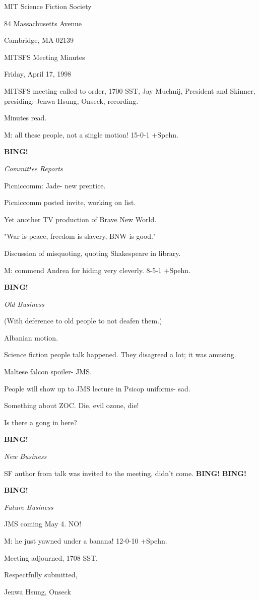 \documentclass[12pt]{article}
\newcommand{\bing}{{\bf BING!} }
\newcommand{\goto}[1]{\bing \vskip 12pt \centerline{{\em{#1}}}}
\begin{document}
\begin{center}

MIT Science Fiction Society 

84 Massachusetts Avenue

Cambridge, MA 02139

\vspace{12pt}

MITSFS Meeting Minutes 

Friday, April 17, 1998

\end{center}
 
\vspace{18pt}

\setlength{\parskip}{6pt}

\noindent
MITSFS meeting called to order, 1700 SST,
Jay Muchnij, President and Skinner, presiding; Jenwa Hsung, Onseck, recording.

Minutes read.

M: all these people, not a single motion! 15-0-1 +Spehn.

\goto{Committee Reports}

Picniccomm: Jade- new prentice.

Picniccomm posted invite, working on list.

Yet another TV production of Brave New World.

"War is peace, freedom is slavery, BNW is good."

Discussion of misquoting, quoting Shakespeare in library.

M: commend Andrea for hiding very cleverly. 8-5-1 +Spehn.

\goto{Old Business}

(With deference to old people to not deafen them.)

Albanian motion.

Science fiction people talk happened. They disagreed a lot; it was amusing.

Maltese falcon spoiler- JMS.

People will show up to JMS lecture in Psicop uniforms- sad.

Something about ZOC. Die, evil ozone, die!

Is there a gong in here?

\goto{New Business}

SF author from talk was invited to the meeting, didn't come. \bing \bing

\goto{Future Business}

JMS coming May 4. NO!

M: he just yawned under a banana! 12-0-10 +Spehn.

\vspace{12pt}

\noindent
Meeting adjourned, 1708 SST.

\vspace{18pt}

\centerline{Respectfully submitted,}
\centerline{Jenwa Hsung, Onseck}
\end{document}
